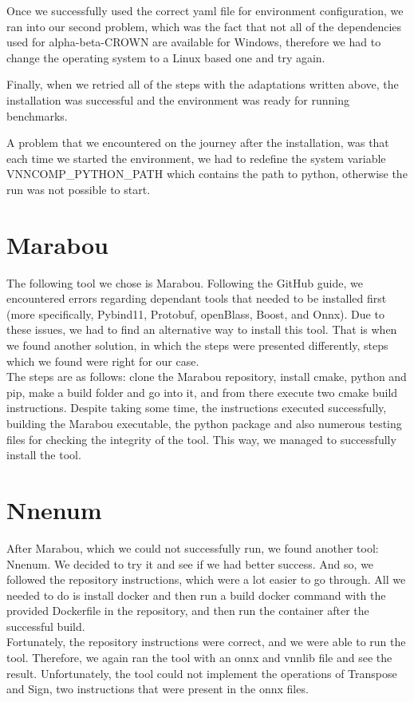 \documentclass[12pt,a4paper]{report}
\newcommand\tab[1][5mm]{\hspace*{#1}}
\begin{document}
Once we successfully used the correct yaml file for environment configuration, we ran into our second problem, which was the fact that not all of the dependencies used for alpha-beta-CROWN are available for Windows, therefore we had to change the operating system to a Linux based one and try again.

Finally, when we retried all of the steps with the adaptations written above, the installation was successful and the environment was ready for running benchmarks.

A problem that we encountered on the journey after the installation, was that each time we started the environment, we had to redefine the system variable VNNCOMP\_PYTHON\_PATH which contains the path to python, otherwise the run was not possible to start.

\newpage
\section{Marabou}
\tab The following tool we chose is Marabou\cite{marabou-repository}. Following the GitHub guide, we encountered errors regarding dependant tools that needed to be installed first (more specifically, Pybind11, Protobuf, openBlass, Boost, and Onnx). Due to these issues, we had to find an alternative way to install this tool. That is when we found another solution\cite{marabou-guide}, in which the steps were presented differently, steps which we found were right for our case.\\
\tab The steps are as follows: clone the Marabou repository, install cmake, python and pip, make a build folder and go into it, and from there execute two cmake build instructions. Despite taking some time, the instructions executed successfully, building the Marabou executable, the python package and also numerous testing files for checking the integrity of the tool. This way, we managed to successfully install the tool.\\

\section{Nnenum}
\tab After Marabou, which we could not successfully run, we found another tool: Nnenum\cite{nnenum-repository}. We decided to try it and see if we had better success. And so, we followed the repository instructions, which were a lot easier to go through. All we needed to do is install docker and then run a build docker command with the provided Dockerfile in the repository, and then run the container after the successful build.\\
\tab Fortunately, the repository instructions were correct, and we were able to run the tool. Therefore, we again ran the tool with an onnx and vnnlib file and see the result. Unfortunately, the tool could not implement the operations of Transpose and Sign, two instructions that were present in the onnx files.
\end{document}
